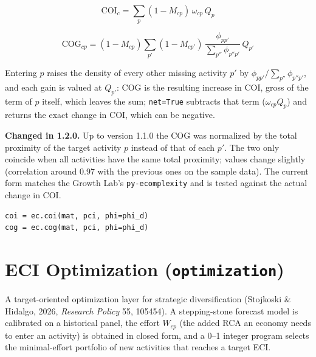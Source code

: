 \documentclass[12pt, a4paper]{article}
\begin{document}
\[
  \text{COI}_c = \sum_p (1 - M_{cp})\,\omega_{cp}\,Q_p
\]

\[
  \text{COG}_{cp} = (1 - M_{cp}) \sum_{p'} (1 - M_{cp'})\,
     \frac{\phi_{pp'}}{\sum_{p''} \phi_{p''p'}}\,Q_{p'}
\]

Entering $p$ raises the density of every other missing activity $p'$ by
$\phi_{pp'}/\sum_{p''}\phi_{p''p'}$, and each gain is valued at $Q_{p'}$:
COG is the resulting increase in COI, gross of the term of $p$ itself,
which leaves the sum; \texttt{net=True} subtracts that term
($\omega_{cp} Q_p$) and returns the exact change in COI, which can be
negative.

\begin{notebox}
  \textbf{Changed in 1.2.0.} Up to version 1.1.0 the COG was normalized
  by the total proximity of the target activity $p$ instead of that of
  each $p'$. The two only coincide when all activities have the same
  total proximity; values change slightly (correlation around 0.97 with
  the previous ones on the sample data). The current form matches the
  Growth Lab's \texttt{py-ecomplexity} and is tested against the actual
  change in COI.
\end{notebox}

\begin{lstlisting}[caption={COI and COG}]
coi = ec.coi(mat, pci, phi=phi_d)
cog = ec.cog(mat, pci, phi=phi_d)
\end{lstlisting}

\section{ECI Optimization (\texttt{optimization})}

A target-oriented optimization layer for strategic diversification
(Stojkoski \& Hidalgo, 2026, \emph{Research Policy} 55, 105454).
A stepping-stone forecast model is calibrated on a historical panel,
the effort $W_{cp}$ (the added RCA an economy needs to enter an
activity) is obtained in closed form, and a 0--1 integer program
selects the minimal-effort portfolio of new activities that reaches a
target ECI.
\end{document}

